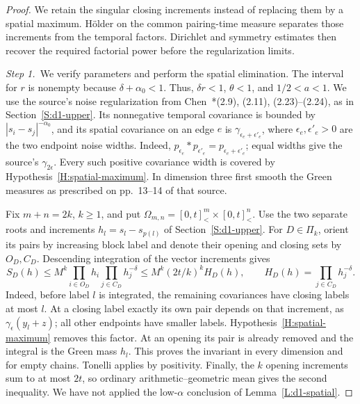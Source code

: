 \documentclass[12pt,oneside,openany]{book}
\numberwithin{equation}{section}
\theoremstyle{nogostyle}
\theoremstyle{definition}
\begin{document}
\begin{proof}
  We retain the singular closing increments instead of replacing them by a
  spatial maximum. Hölder on the common pairing-time measure separates those
  increments from the temporal factors. Dirichlet and symmetry estimates then
  recover the required factorial power before the regularization limits.


  \medskip
  \noindent\textit{Step 1.~}We verify parameters and perform the spatial
  elimination.
  The interval for $r$ is nonempty because $\delta+\alpha_0 < 1$. Thus, $\delta
  r < 1$, $\theta < 1$, and $1/2 < a < 1$. We use the source's noise
  regularization from Chen~\cite{chen:author2026:time-dependency}*{(2.9),
  (2.11), (2.23)--(2.24)}, as in Section~\ref{S:d1-upper}. Its nonnegative
  temporal covariance is bounded by $|s_i-s_j|^{-\alpha_0}$, and its spatial
  covariance on an edge $e$ is $\gamma_{\epsilon_e+\epsilon'_e}$, where
  $\epsilon_e,\epsilon'_e > 0$ are the two endpoint noise widths. Indeed,
  $p_{\epsilon_e}*p_{\epsilon'_e} = p_{\epsilon_e+\epsilon'_e}$; equal widths
  give the source's $\gamma_{2\epsilon}$. Every such positive covariance width
  is covered by Hypothesis~\ref{H:spatial-maximum}. In dimension three first
  smooth the Green measures as prescribed on pp.~13--14 of that source.

  Fix $m+n = 2k$, $k \ge 1$, and put $\Omega_{m,n} = [0,t]^m_ < \times[0,t]^n_
  <$. Use the two separate roots and increments $h_l = s_l-s_{p(l)}$ of
  Section~\ref{S:d1-upper}. For $D \in \Pi_k$, orient its pairs by increasing
  block label and denote their opening and closing sets by $O_D,C_D$. Descending
  integration of the vector increments gives
  \[
    S_D(h)\le M^k\prod_{i\in O_D}h_i\prod_{j\in C_D}h_j^{-\delta}
    \le M^k(2t/k)^k H_D(h),\qquad
    H_D(h)=\prod_{j\in C_D}h_j^{-\delta}.
  \]
  Indeed, before label $l$ is integrated, the remaining covariances have closing
  labels at most $l$. At a closing label exactly its own pair depends on that
  increment, as $\gamma_\epsilon(y_l+z)$; all other endpoints have smaller
  labels. Hypothesis~\ref{H:spatial-maximum} removes this factor. At an opening
  its pair is already removed and the integral is the Green mass $h_l$. This
  proves the invariant in every dimension and for empty chains. Tonelli applies
  by positivity. Finally, the $k$ opening increments sum to at most $2t$, so
  ordinary arithmetic--geometric mean gives the second inequality. We have not
  applied the low-$\alpha$ conclusion of Lemma~\ref{L:d1-spatial}.



\end{proof}
\end{document}
